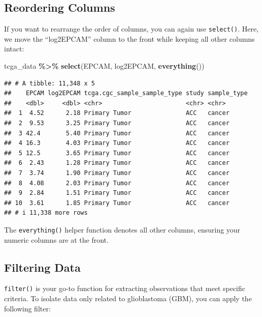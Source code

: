 \documentclass[
]{book}
\newenvironment{Shaded}{\begin{snugshade}}{\end{snugshade}}
\newcommand{\FunctionTok}[1]{\textcolor[rgb]{0.13,0.29,0.53}{\textbf{#1}}}
\newcommand{\NormalTok}[1]{#1}
\newcommand{\SpecialCharTok}[1]{\textcolor[rgb]{0.81,0.36,0.00}{\textbf{#1}}}
\begin{document}
\hypertarget{reordering-columns}{%
\subsection{Reordering Columns}\label{reordering-columns}}

If you want to rearrange the order of columns, you can again use \texttt{select()}. Here, we move the ``log2EPCAM'' column to the front while keeping all other columns intact:

\begin{Shaded}
\begin{Highlighting}[]
\NormalTok{tcga\_data }\SpecialCharTok{\%\textgreater{}\%}
  \FunctionTok{select}\NormalTok{(EPCAM, log2EPCAM, }\FunctionTok{everything}\NormalTok{())}
\end{Highlighting}
\end{Shaded}

\begin{verbatim}
## # A tibble: 11,348 x 5
##    EPCAM log2EPCAM tcga.cgc_sample_sample_type study sample_type
##    <dbl>     <dbl> <chr>                       <chr> <chr>      
##  1  4.52      2.18 Primary Tumor               ACC   cancer     
##  2  9.53      3.25 Primary Tumor               ACC   cancer     
##  3 42.4       5.40 Primary Tumor               ACC   cancer     
##  4 16.3       4.03 Primary Tumor               ACC   cancer     
##  5 12.5       3.65 Primary Tumor               ACC   cancer     
##  6  2.43      1.28 Primary Tumor               ACC   cancer     
##  7  3.74      1.90 Primary Tumor               ACC   cancer     
##  8  4.08      2.03 Primary Tumor               ACC   cancer     
##  9  2.84      1.51 Primary Tumor               ACC   cancer     
## 10  3.61      1.85 Primary Tumor               ACC   cancer     
## # i 11,338 more rows
\end{verbatim}

The \texttt{everything()} helper function denotes all other columns, ensuring your numeric columns are at the front.

\hypertarget{filtering-data}{%
\subsection{Filtering Data}\label{filtering-data}}

\texttt{filter()} is your go-to function for extracting observations that meet specific criteria. To isolate data only related to glioblastoma (GBM), you can apply the following filter:
\end{document}

